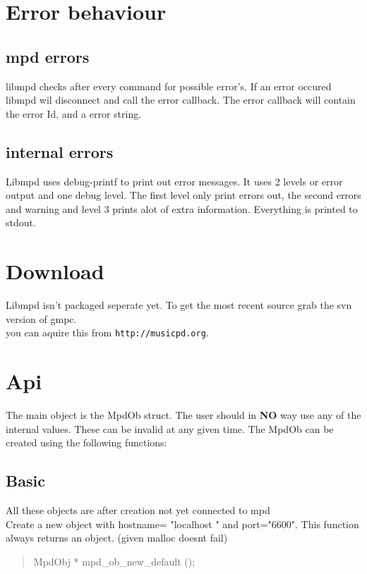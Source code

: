 \documentclass[a4paper,11pt]{article}
\newcommand{\tmstrong}[1]{\textbf{#1}}
\begin{document}
\section{Error behaviour}
\subsection{mpd errors}
libmpd checks after every command for possible error's. If an error occured
libmpd wil disconnect and call the error callback. The error callback will
contain the error Id, and a error string.
\subsection {internal errors}
Libmpd uses debug-printf to print out error messages. It uses 2 levels or error output and one debug level.
The first level only print errors out, the second errors and warning and level 3 prints alot of extra information.
Everything is printed to stdout.

\section{Download}
Libmpd isn't packaged seperate yet. To get the most recent source grab the svn version of gmpc.\\
you can aquire this from \verb|http://musicpd.org|.\\


\section{Api}
The main object is the MpdOb struct. The user should in {\tmstrong{NO}} way
use any of the internal values. These can be invalid at any given time. The
MpdOb can be created using the following functions:

\subsection{Basic}

All these objects are after creation not yet connected to mpd\\

Create a new object with hostname= "localhost " and port="6600". This function always returns an object. (given malloc doesnt fail)
\begin{quote}
MpdObj * mpd\_ob\_new\_default (); 
\end{quote}
\end{document}
